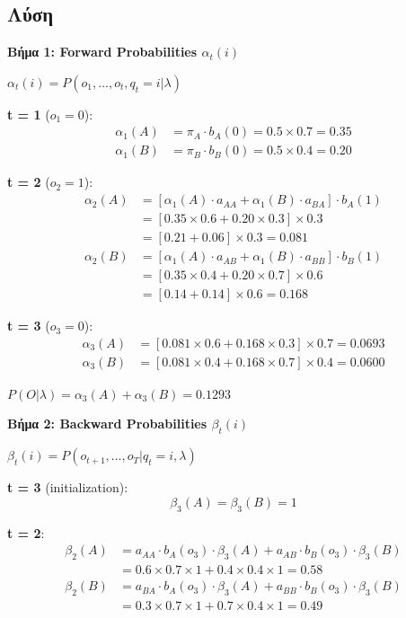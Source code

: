 \subsection*{Λύση}

\textbf{Βήμα 1: Forward Probabilities $\alpha_t(i)$}

$\alpha_t(i) = P(o_1, ..., o_t, q_t = i | \lambda)$

\textbf{t = 1} ($o_1 = 0$):
\begin{align*}
\alpha_1(A) &= \pi_A \cdot b_A(0) = 0.5 \times 0.7 = 0.35 \\
\alpha_1(B) &= \pi_B \cdot b_B(0) = 0.5 \times 0.4 = 0.20
\end{align*}

\textbf{t = 2} ($o_2 = 1$):
\begin{align*}
\alpha_2(A) &= [\alpha_1(A) \cdot a_{AA} + \alpha_1(B) \cdot a_{BA}] \cdot b_A(1) \\
&= [0.35 \times 0.6 + 0.20 \times 0.3] \times 0.3 \\
&= [0.21 + 0.06] \times 0.3 = 0.081 \\
\alpha_2(B) &= [\alpha_1(A) \cdot a_{AB} + \alpha_1(B) \cdot a_{BB}] \cdot b_B(1) \\
&= [0.35 \times 0.4 + 0.20 \times 0.7] \times 0.6 \\
&= [0.14 + 0.14] \times 0.6 = 0.168
\end{align*}

\textbf{t = 3} ($o_3 = 0$):
\begin{align*}
\alpha_3(A) &= [0.081 \times 0.6 + 0.168 \times 0.3] \times 0.7 = 0.0693 \\
\alpha_3(B) &= [0.081 \times 0.4 + 0.168 \times 0.7] \times 0.4 = 0.0600
\end{align*}

$P(O|\lambda) = \alpha_3(A) + \alpha_3(B) = 0.1293$

\textbf{Βήμα 2: Backward Probabilities $\beta_t(i)$}

$\beta_t(i) = P(o_{t+1}, ..., o_T | q_t = i, \lambda)$

\textbf{t = 3} (initialization):
$$\beta_3(A) = \beta_3(B) = 1$$

\textbf{t = 2}:
\begin{align*}
\beta_2(A) &= a_{AA} \cdot b_A(o_3) \cdot \beta_3(A) + a_{AB} \cdot b_B(o_3) \cdot \beta_3(B) \\
&= 0.6 \times 0.7 \times 1 + 0.4 \times 0.4 \times 1 = 0.58 \\
\beta_2(B) &= a_{BA} \cdot b_A(o_3) \cdot \beta_3(A) + a_{BB} \cdot b_B(o_3) \cdot \beta_3(B) \\
&= 0.3 \times 0.7 \times 1 + 0.7 \times 0.4 \times 1 = 0.49
\end{align*}

